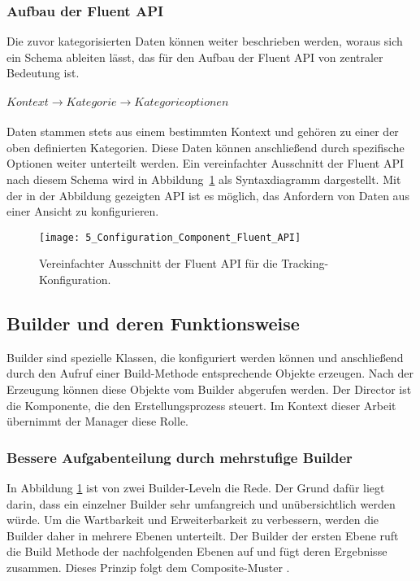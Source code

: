 \subsubsection{Aufbau der Fluent API}
Die zuvor kategorisierten Daten können weiter beschrieben werden, woraus sich ein Schema ableiten lässt, das für den Aufbau der Fluent API von zentraler Bedeutung ist.\\
\\
$Kontext \rightarrow Kategorie \rightarrow Kategorieoptionen$\\
\\
Daten stammen stets aus einem bestimmten Kontext und gehören zu einer der oben definierten Kategorien. Diese Daten können anschließend durch spezifische Optionen weiter unterteilt werden. Ein vereinfachter Ausschnitt der Fluent API nach diesem Schema wird in Abbildung~\ref{fig:configuration_component_fluent_api} als Syntaxdiagramm dargestellt. Mit der in der Abbildung gezeigten API ist es möglich, das Anfordern von Daten aus einer Ansicht zu konfigurieren.

\begin{figure}[H]
    \centering
    \texttt{[image: 5\_Configuration\_Component\_Fluent\_API]}
    \caption{Vereinfachter Ausschnitt der Fluent API für die Tracking-Konfiguration.}
    \label{fig:configuration_component_fluent_api}
\end{figure}

\subsection{Builder und deren Funktionsweise}
Builder \cite{sarcar2004design} sind spezielle Klassen, die konfiguriert werden können und anschließend durch den Aufruf einer Build-Methode entsprechende Objekte erzeugen. Nach der Erzeugung können diese Objekte vom Builder abgerufen werden. Der Director ist die Komponente, die den Erstellungsprozess steuert. Im Kontext dieser Arbeit übernimmt der Manager diese Rolle.

\subsubsection{Bessere Aufgabenteilung durch mehrstufige Builder}
In Abbildung \ref{fig:configuration_component_fluent_api} ist von zwei Builder-Leveln die Rede. Der Grund dafür liegt darin, dass ein einzelner Builder sehr umfangreich und unübersichtlich werden würde. Um die Wartbarkeit und Erweiterbarkeit zu verbessern, werden die Builder daher in mehrere Ebenen unterteilt.  
Der Builder der ersten Ebene ruft die Build Methode der nachfolgenden Ebenen auf und fügt deren Ergebnisse zusammen. Dieses Prinzip folgt dem Composite-Muster \cite{gamma1995design}.

